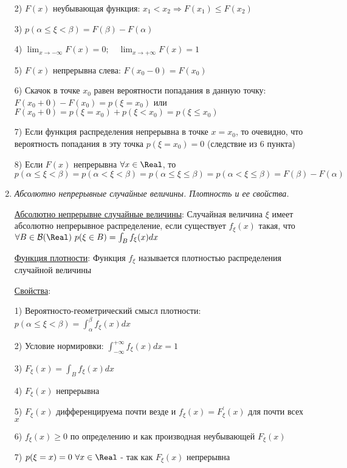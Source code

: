 \begin{enumerate}
    2) $F(x)$ неубывающая функция: $x_1 < x_2 \Longrightarrow F(x_1) \leq F(x_2)$ 

    3) $p(\alpha \leq \xi < \beta) = F(\beta) - F(\alpha)$

    4) $\lim_{x \to -\infty} F(x) = 0; \quad \lim_{x \to +\infty} F(x) = 1$
    
    5) $F(x)$ непрерывна слева: $F(x_0 - 0) = F(x_0)$

    6) Скачок в точке $x_0$ равен вероятности попадания в данную точку: $F(x_0 + 0) - F(x_0) = p(\xi = x_0)$ или $F(x_0 + 0) = p(\xi = x_0) + p(\xi < x_0) = p(\xi \leq x_0)$

    7) Если функция распределения непрерывна в точке $x = x_0$, то очевидно, что вероятность попадания в эту точка $p(\xi = x_0) = 0$ (следствие из 6 пункта)
    
    8) Если $F(x)$ непрерывна $\forall x \in \Real$, то $p(\alpha \leq \xi < \beta) = p(\alpha < \xi < \beta) = p(\alpha \leq \xi \leq \beta) = p(\alpha < \xi \leq \beta) = F(\beta) - F(\alpha)$
    
    \item \textit{Абсолютно непрерывные случайные величины. Плотность и ее свойства.}

    \hyperlink{continuousdistributionproperties}{Абсолютно непрерывне случайные величины}: Случайная величина $\xi$ имеет абсолютно непрерывное распределение, если существует $f_\xi(x)$ такая, что $\forall B \in \mathcal{B}(\Real)
    \ p(\xi \in B) = \int_B f_\xi(x)dx$

    \hyperlink{densityfunctiondefinition}{Функция плотности}: Функция $f_\xi$ называется плотностью распределения случайной величины

    \hyperlink{densityfunctionproperties}{Свойства}:

    1) Вероятносто-геометрический смысл плотности: $p(\alpha \leq \xi < \beta) = \int_{\alpha}^\beta f_\xi(x) dx$

    2) Условие нормировки: $\int_{-\infty}^{+\infty} f_\xi(x)dx = 1$

    3) $F_\xi(x) = \int_B f_\xi(x)dx$

    4) $F_\xi(x)$ непрерывна 

    5) $F_\xi(x)$ дифференцируема почти везде и $f_\xi(x) = F^\prime_\xi(x)$ для почти всех $x$

    6) $f_\xi(x) \geq 0$ по определению и как производная неубывающей $F_\xi(x)$

    7) $p(\xi = x) = 0 \ \forall x \in \Real$ - так как $F_\xi(x)$ непрерывна


\end{enumerate}
